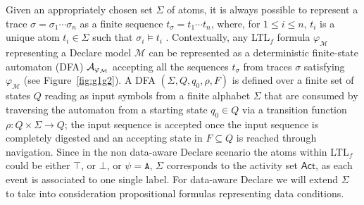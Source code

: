 

Given an appropriately chosen set $\Sigma$ of atoms, it is always possible to represent a trace $\sigma=\sigma_1\cdots \sigma_n$ as a finite sequence $t_\sigma=t_1\cdots t_n$, where, for $1\leq i\leq n$, $t_i$ is a unique atom $t_i\in\Sigma$ such that $\sigma_i\vDash t_i$ \cite{XuLZ17a}.
Contextually,  any LTL$_f$ formula $\varphi_{\mathcal{M}}$ representing a Declare model $\mathcal{M}$ can be represented as a deterministic finite-state automaton (DFA) $\mathcal{A}_{\varphi_{\tiny\mathcal{M}}}$ \cite{Westergaard11} accepting all the sequences $t_\sigma$ from traces $\sigma$ satisfying $\varphi_{\mathcal{M}}$ (see Figure~\ref{fig:g1g2}). A DFA  $(\Sigma,Q,q_0,\rho,F)$ is defined \cite{0016921} over a finite set of states $Q$ reading as input symbols from a finite alphabet $\Sigma$ that are consumed by traversing the automaton from a starting state $q_0\in Q$ via a transition function $\rho\colon Q\times \Sigma\to Q$; the input sequence is accepted once the input sequence is completely digested and an accepting state in $F\subseteq Q$ is reached through navigation. Since in the non data-aware Declare scenario the atoms within LTL$_f$ could be either $\top$, or $\bot$, or $\psi=\texttt{A}$, $\Sigma$ corresponds to the activity set  $\textsf{Act}$, as each event is associated to one single label. For data-aware Declare we will extend $\Sigma$ to take into consideration propositional formulas representing data conditions.


